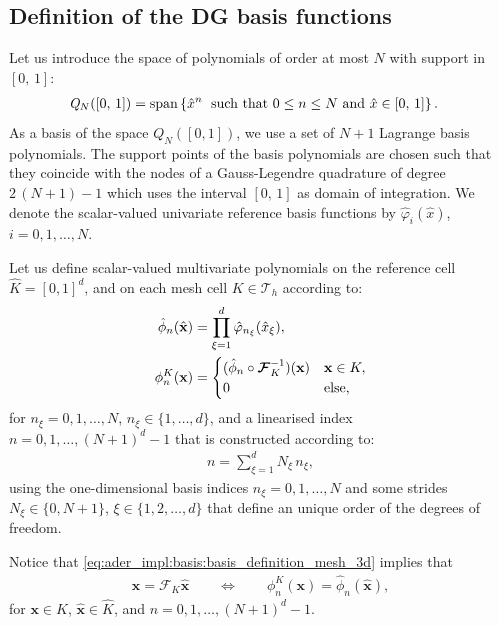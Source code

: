 \documentclass{scrreprt}
\theoremstyle{definition}
\theoremstyle{nonumberplain}
\renewcommand{\vec}[1]{{\textbf{#1}}}
\newcommand{\tria}{\mathcal{T}_h}
\newcommand{\cell}{K}
\newcommand{\refVec}[1]{\hat{\vec{#1}}}
\newcommand{\refCell}{\hat{\cell}}
\newcommand{\mapping}{\boldsymbol{\mathcal{F}}_{\cell}}
\newcommand{\imapping}{\boldsymbol{\mathcal{F}}^{-1}_{\cell}}
\newcommand{\polyspace}[3]{\mathit{#1}_{#2}(#3)}
\begin{document}
\subsection{Definition of the DG basis functions}
Let us introduce the space of polynomials of order
at most $N$ with support in $[0,\,1]$:
\begin{align*}
\polyspace{Q}{N}{[0,\,1]} &= \text{span}\left\{
\hat{x}^{n}\; \text{ such that }
0\leq n \leq N \textup{ and }\hat{x} \in [0,\,1] \right\}.
\end{align*}
As a basis of the space
$\polyspace{Q}{N}{[0,1]}$,
we use a set of $N+1$ Lagrange basis polynomials.
The support points of the basis polynomials are chosen such that
they coincide with the nodes of a Gauss-Legendre quadrature of degree
$2\,(N+1)-1$ which uses the interval $[0,\,1]$
as domain of integration. We denote the scalar-valued univariate reference basis
functions by $\hat{\varphi}_i(\hat{x})$, $i=0,1,\ldots,N$.

Let us define scalar-valued multivariate polynomials on the reference cell
$\refCell=[0,1]^d$,
and on each mesh cell $\cell\in\tria$
according to:
\begin{align}
\label{eq:ader_impl:basis:basis_definition_ref_3d}
\hat{\phi}_n (\refVec{x}) &=
\prod^{d}_{\xi=1}
\hat{\varphi}_{n_\xi} (\hat{x}_\xi),
\\
\label{eq:ader_impl:basis:basis_definition_mesh_3d}
\phi^{K}_n (\vec{x}) &=
\begin{cases}
(\hat{\phi}_n \circ \imapping) (\vec{x}) & \vec{x}\in\cell,
\\
0 & \textup{else},
\end{cases}
\end{align}
for $n_\xi=0,1,\ldots,N$, $n_\xi\in\{1,\ldots,d\}$,
and a linearised index $n=0,1,\ldots,(N+1)^{d}-1$
that is constructed according to:
\begin{align*}
n = \sum_{\xi=1}^{d} N_\xi\,n_\xi,
\end{align*}
using the one-dimensional basis indices $n_\xi={0,1,\ldots,N}$ and some strides
$N_\xi\in\{0,N+1\}$, $\xi \in \{1,2,\ldots,d\}$ that define an unique order of
the degrees of freedom.

Notice that \eqref{eq:ader_impl:basis:basis_definition_mesh_3d} implies that
\begin{align*}
\vec{x} = \mapping \refVec{x}
\qquad
\Leftrightarrow
\qquad
\phi^{K}_n (\vec{x}) =
\hat{\phi}_n (\refVec{x}),
\end{align*}
for $\vec{x}\in\cell$, $\refVec{x}\in\refCell$,
and $n=0,1,\ldots,(N+1)^{d}-1$.
\end{document}
